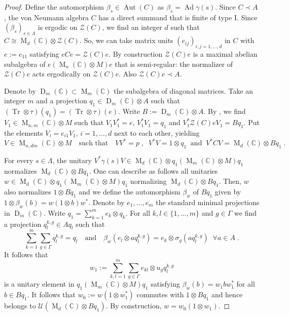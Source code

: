 \documentclass[a4paper,11pt]{amsart}
\numberwithin{equation}{section}
\begin{document}
\begin{proof}
Define the automorphism $\beta_s \in {\operatorname{Aut}}(C)$ as $\beta_s = {\operatorname{Ad}} \gamma(s)$.
Since $C {\prec} A$, the von Neumann algebra $C$ has a direct summand that is finite of type I. Since $({\beta}_s)_{s \in \Lambda}$ is ergodic on ${\mathcal{Z}}(C)$, we find an integer $d$ such that $C \cong {\operatorname{M}}_d({\mathbb{C}}) {\otimes} {\mathcal{Z}}(C)$. So, we can take matrix units $(e_{ij})_{i,j=1,\ldots,d}$ in $C$ with $e := e_{11}$ satisfying $e C e = {\mathcal{Z}}(C) e$. By construction ${\mathcal{Z}}(C) e$ is a maximal abelian subalgebra of $e ({\operatorname{M}}_n({\mathbb{C}}) {\otimes} M)e$ that is semi-regular: the normalizer of ${\mathcal{Z}}(C) e$ acts ergodically on ${\mathcal{Z}}(C) e$. Also ${\mathcal{Z}}(C) e {\prec} A$.

Denote by ${\operatorname{D}}_m({\mathbb{C}}) \subset {\operatorname{M}}_m({\mathbb{C}})$ the subalgebra of diagonal
matrices. Take an integer $m$ and a projection $q_1 \in {\operatorname{D}}_m({\mathbb{C}}) {\otimes}
A$ such that $({\operatorname{Tr}} {\otimes} \tau)(q_1) = ({\operatorname{Tr}} {\otimes} \tau)(e)$. Write $B :=
{\operatorname{D}}_m({\mathbb{C}}) {\otimes} A$. By \cite[Theorem A.1]{Po01b}, we find $V_1 \in
{\operatorname{M}}_{n,m}({\mathbb{C}}) {\otimes} M$ such that $V_1 V_1^* = e$, $V_1^* V_1 = q_1$ and
$V_1^* {\mathcal{Z}}(C) e V_1 = B q_1$. Put the elements $V_i = e_{i1} V_1$,
$i=1,\ldots,d$ next to each other, yielding
$$V \in {\operatorname{M}}_{n,d m}({\mathbb{C}}) {\otimes} M \quad\text{such that}\quad V V^* = p \; , \;\; V^* V = 1 {\otimes} q_1 \;\;\text{and}\;\; V^* C V = {\operatorname{M}}_d({\mathbb{C}}) {\otimes} Bq_1 \; .$$

For every $s \in \Lambda$, the unitary $V^* \gamma(s) V \in {\operatorname{M}}_d({\mathbb{C}}) {\otimes} q_1 ({\operatorname{M}}_m({\mathbb{C}}) {\otimes} M)q_1$ normalizes ${\operatorname{M}}_d({\mathbb{C}}) {\otimes} Bq_1$. One can describe as follows all unitaries $w \in {\operatorname{M}}_d({\mathbb{C}}) {\otimes} q_1({\operatorname{M}}_m({\mathbb{C}}) {\otimes} M)q_1$ normalizing ${\operatorname{M}}_d({\mathbb{C}}) {\otimes} Bq_1$. Then, $w$ also normalizes $1 {\otimes} B q_1$ and we define the automorphism $\beta_w$ of $B q_1$ given by $1 {\otimes} \beta_w(b) = w(1 {\otimes} b)w^*$.
Denote by $e_1,\ldots,e_m$ the standard minimal projections in ${\operatorname{D}}_m({\mathbb{C}})$.
Write $q_1 = \sum_{k=1}^m e_k {\otimes} q_k$. For all $k,l \in \{1,\ldots,m\}$ and $g \in \Gamma$ we find a projection $q^{k,g}_l \in A q_l$ such that
$$\sum_{k=1}^m \sum_{g \in \Gamma} q^{k,g}_l = q_l \quad\text{and}\quad \beta_w(e_l {\otimes} a q^{k,g}_l) = e_k {\otimes} {\sigma}_g(a q^{k,g}_l) \;\;\forall a \in A \; .$$
It follows that
$$w_1 := \sum_{k,l=1}^m \sum_{g \in \Gamma} e_{kl} {\otimes} u_g q^{k,g}_l$$
is a unitary element in $q_1({\operatorname{M}}_m({\mathbb{C}}) {\otimes} M) q_1$ satisfying $\beta_w(b) = w_1 b w_1^*$ for all $b \in B q_1$. It follows that $w_0 := w (1 {\otimes} w_1^*)$ commutes with $1 {\otimes} Bq_1$ and hence belongs to ${\mathcal{U}}({\operatorname{M}}_d({\mathbb{C}}) {\otimes} Bq_1)$. By construction, $w = w_0 (1 {\otimes} w_1)$.


\end{proof}
\end{document}
